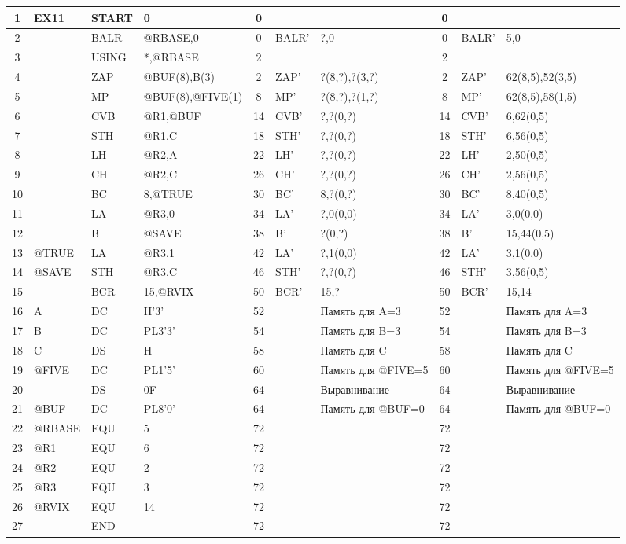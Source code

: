 \documentclass[12pt, a4paper]{article}
\begin{document}
\begin{landscape}
\begin{longtable}{|c|l|l|l|c|l|l|c|l|l|}
1 & EX11 & START & 0 & 0 & & & 0 & & \\ \hline
2 & & BALR & @RBASE,0 & 0 & BALR' & ?,0 & 0 & BALR' & 5,0 \\ \hline
3 & & USING & *,@RBASE & 2 & & & 2 & & \\ \hline
4 & & ZAP & @BUF(8),B(3) & 2 & ZAP' & ?(8,?),?(3,?) & 2 & ZAP' & 62(8,5),52(3,5) \\ \hline
5 & & MP & @BUF(8),@FIVE(1) & 8 & MP' & ?(8,?),?(1,?) & 8 & MP' & 62(8,5),58(1,5) \\ \hline
6 & & CVB & @R1,@BUF & 14 & CVB' & ?,?(0,?) & 14 & CVB' & 6,62(0,5) \\ \hline
7 & & STH & @R1,C & 18 & STH' & ?,?(0,?) & 18 & STH' & 6,56(0,5) \\ \hline
8 & & LH & @R2,A & 22 & LH' & ?,?(0,?) & 22 & LH' & 2,50(0,5) \\ \hline
9 & & CH & @R2,C & 26 & CH' & ?,?(0,?) & 26 & CH' & 2,56(0,5) \\ \hline
10 & & BC & 8,@TRUE & 30 & BC' & 8,?(0,?) & 30 & BC' & 8,40(0,5) \\ \hline
11 & & LA & @R3,0 & 34 & LA' & ?,0(0,0) & 34 & LA' & 3,0(0,0) \\ \hline
12 & & B & @SAVE & 38 & B' & ?(0,?) & 38 & B' & 15,44(0,5) \\ \hline
13 & @TRUE & LA & @R3,1 & 42 & LA' & ?,1(0,0) & 42 & LA' & 3,1(0,0) \\ \hline
14 & @SAVE & STH & @R3,C & 46 & STH' & ?,?(0,?) & 46 & STH' & 3,56(0,5) \\ \hline
15 & & BCR & 15,@RVIX & 50 & BCR' & 15,? & 50 & BCR' & 15,14 \\ \hline
16 & A & DC & H'3' & 52 & & Память для A=3 & 52 & & Память для A=3 \\ \hline
17 & B & DC & PL3'3' & 54 & & Память для B=3 & 54 & & Память для B=3 \\ \hline
18 & C & DS & H & 58 & & Память для C & 58 & & Память для C \\ \hline
19 & @FIVE & DC & PL1'5' & 60 & & Память для @FIVE=5 & 60 & & Память для @FIVE=5 \\ \hline
20 & & DS & 0F & 64 & & Выравнивание & 64 & & Выравнивание \\ \hline
21 & @BUF & DC & PL8'0' & 64 & & Память для @BUF=0 & 64 & & Память для @BUF=0 \\ \hline
22 & @RBASE & EQU & 5 & 72 & & & 72 & & \\ \hline
23 & @R1 & EQU & 6 & 72 & & & 72 & & \\ \hline
24 & @R2 & EQU & 2 & 72 & & & 72 & & \\ \hline
25 & @R3 & EQU & 3 & 72 & & & 72 & & \\ \hline
26 & @RVIX & EQU & 14 & 72 & & & 72 & & \\ \hline
27 & & END & & 72 & & & 72 & & \\ \hline
\end{longtable}
\normalsize
\end{landscape}
\end{document}
